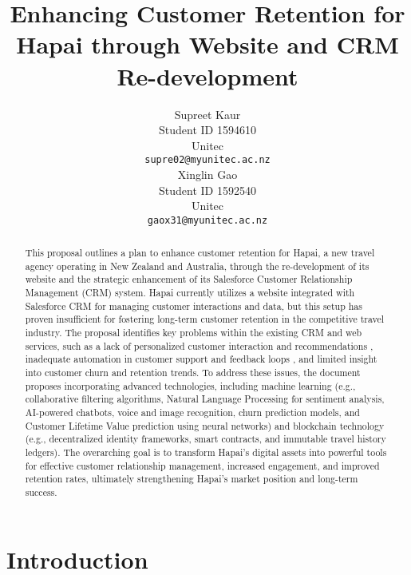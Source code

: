 \documentclass{article}
\title{Enhancing Customer Retention for Hapai through Website and CRM Re-development
}
\author{
  Supreet Kaur \\
  Student ID 1594610 \\
  Unitec \\
  \texttt{supre02@myunitec.ac.nz} \\
   \And
  Xinglin Gao \\
  Student ID 1592540 \\
  Unitec \\
  \texttt{gaox31@myunitec.ac.nz} \\
}
\begin{document}
\maketitle


\begin{abstract}
This proposal outlines a plan to enhance customer retention for Hapai, a new travel agency operating in New Zealand and Australia, through the re-development of its website and the strategic enhancement of its Salesforce Customer Relationship Management (CRM) system. Hapai currently utilizes a website integrated with Salesforce CRM for managing customer interactions and data, but this setup has proven insufficient for fostering long-term customer retention in the competitive travel industry. The proposal identifies key problems within the existing CRM and web services, such as a lack of personalized customer interaction and recommendations , inadequate automation in customer support and feedback loops , and limited insight into customer churn and retention trends. To address these issues, the document proposes incorporating advanced technologies, including machine learning (e.g., collaborative filtering algorithms, Natural Language Processing for sentiment analysis, AI-powered chatbots, voice and image recognition, churn prediction models, and Customer Lifetime Value prediction using neural networks) and blockchain technology (e.g., decentralized identity frameworks, smart contracts, and immutable travel history ledgers). The overarching goal is to transform Hapai's digital assets into powerful tools for effective customer relationship management, increased engagement, and improved retention rates, ultimately strengthening Hapai's market position and long-term success.
\end{abstract}




\newpage
\tableofcontents %
\newpage

\section{Introduction}
\end{document}
